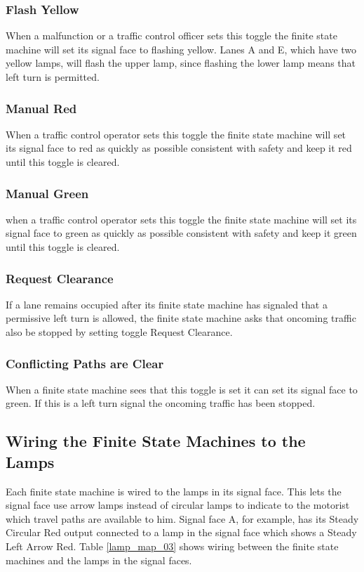 \documentclass[letterpaper,twoside]{article}
\begin{document}
\subsubsection{Flash Yellow}
When a malfunction or a traffic control officer sets this toggle
the finite state machine will set its signal face to flashing yellow.
Lanes A and E, which have two yellow lamps, will flash the upper lamp,
since flashing the lower lamp means that left turn is permitted.

\subsubsection{Manual Red}
When a traffic control operator sets this toggle the finite state machine
will set its signal face to red as quickly as possible consistent with
safety and keep it red until this toggle is cleared.

\subsubsection{Manual Green}
when a traffic control operator sets this toggle the finite state machine
will set its signal face to green as quickly as possible consistent with
safety and keep it green until this toggle is cleared.

\subsubsection{Request Clearance}
If a lane remains occupied after its finite state machine has signaled
that a permissive left turn is allowed, the finite state machine
asks that oncoming traffic also be stopped by setting toggle Request Clearance.

\subsubsection{Conflicting Paths are Clear}
When a finite state machine  sees that this toggle is set it can
set its signal face to green.
If this is a left turn signal the oncoming traffic has been stopped.

\subsection{Wiring the Finite State Machines to the Lamps}

Each finite state machine is wired to the lamps in its signal face.
This lets the signal face  use arrow lamps instead of circular lamps
to indicate to the motorist which travel paths are available to him.
Signal face A, for example, has its Steady Circular Red output
connected to a lamp in the signal face which shows a Steady Left Arrow Red.
Table \ref{lamp_map_03} shows wiring between the finite state
machines and the lamps in the signal faces.
\end{document}

